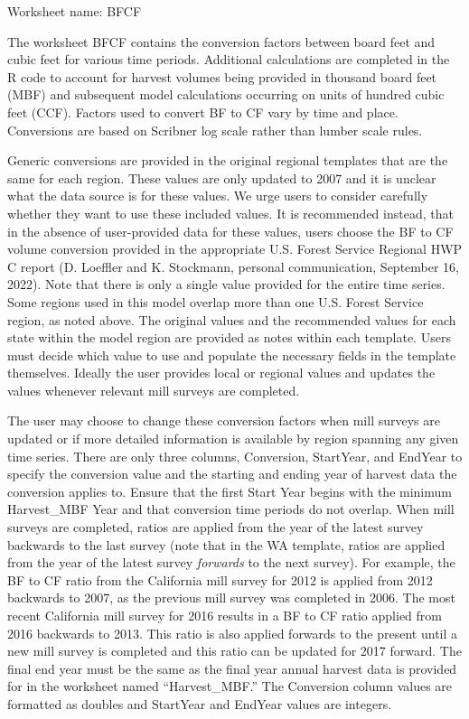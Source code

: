 \documentclass[
  openany]{book}
\begin{document}
Worksheet name: BFCF

The worksheet BFCF contains the conversion factors between board feet
and cubic feet for various time periods. Additional calculations are
completed in the R code to account for harvest volumes being provided in
thousand board feet (MBF) and subsequent model calculations occurring on
units of hundred cubic feet (CCF). Factors used to convert BF to CF vary
by time and place. Conversions are based on Scribner log scale rather
than lumber scale rules.

Generic conversions are provided in the original regional templates that
are the same for each region. These values are only updated to 2007 and
it is unclear what the data source is for these values. We urge users to
consider carefully whether they want to use these included values. It is
recommended instead, that in the absence of user-provided data for these
values, users choose the BF to CF volume conversion provided in the
appropriate U.S. Forest Service Regional HWP C report (D. Loeffler and
K. Stockmann, personal communication, September 16, 2022). Note that
there is only a single value provided for the entire time series. Some
regions used in this model overlap more than one U.S. Forest Service
region, as noted above. The original values and the recommended values
for each state within the model region are provided as notes within each
template. Users must decide which value to use and populate the
necessary fields in the template themselves. Ideally the user provides
local or regional values and updates the values whenever relevant mill
surveys are completed.

The user may choose to change these conversion factors when mill surveys
are updated or if more detailed information is available by region
spanning any given time series. There are only three columns,
Conversion, StartYear, and EndYear to specify the conversion value and
the starting and ending year of harvest data the conversion applies to.
Ensure that the first Start Year begins with the minimum Harvest\_MBF
Year and that conversion time periods do not overlap. When mill surveys
are completed, ratios are applied from the year of the latest survey
backwards to the last survey (note that in the WA template, ratios are
applied from the year of the latest survey \emph{forwards} to the next
survey). For example, the BF to CF ratio from the California mill survey
for 2012 is applied from 2012 backwards to 2007, as the previous mill
survey was completed in 2006. The most recent California mill survey for
2016 results in a BF to CF ratio applied from 2016 backwards to 2013.
This ratio is also applied forwards to the present until a new mill
survey is completed and this ratio can be updated for 2017 forward. The
final end year must be the same as the final year annual harvest data is
provided for in the worksheet named ``Harvest\_MBF.'' The Conversion
column values are formatted as doubles and StartYear and EndYear values
are integers.
\end{document}
